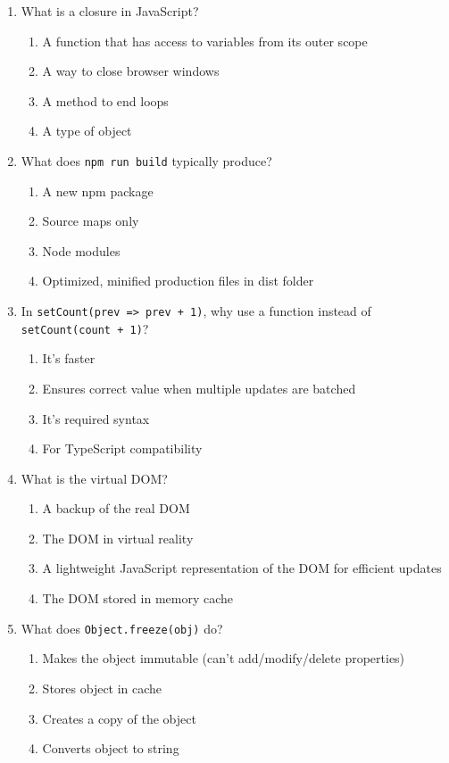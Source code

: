 \documentclass[12pt,a4paper]{article}
\begin{document}
\begin{enumerate}
\item What is a closure in JavaScript?
\begin{enumerate}[label=\Alph*)]
    \item A function that has access to variables from its outer scope
    \item A way to close browser windows
    \item A method to end loops
    \item A type of object
\end{enumerate}

\item What does \texttt{npm run build} typically produce?
\begin{enumerate}[label=\Alph*)]
    \item A new npm package
    \item Source maps only
    \item Node modules
    \item Optimized, minified production files in dist folder
\end{enumerate}

\item In \texttt{setCount(prev => prev + 1)}, why use a function instead of \texttt{setCount(count + 1)}?
\begin{enumerate}[label=\Alph*)]
    \item It's faster
    \item Ensures correct value when multiple updates are batched
    \item It's required syntax
    \item For TypeScript compatibility
\end{enumerate}

\item What is the virtual DOM?
\begin{enumerate}[label=\Alph*)]
    \item A backup of the real DOM
    \item The DOM in virtual reality
    \item A lightweight JavaScript representation of the DOM for efficient updates
    \item The DOM stored in memory cache
\end{enumerate}

\item What does \texttt{Object.freeze(obj)} do?
\begin{enumerate}[label=\Alph*)]
    \item Makes the object immutable (can't add/modify/delete properties)
    \item Stores object in cache
    \item Creates a copy of the object
    \item Converts object to string
\end{enumerate}


\end{enumerate}
\end{document}

